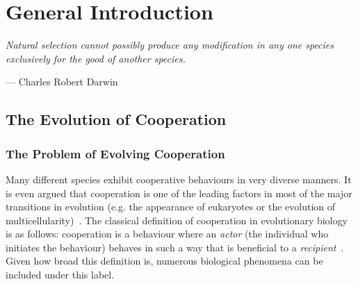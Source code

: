 \chapter{General Introduction}

\epigraph{\textit{Natural selection cannot possibly produce any modification in any one species exclusively for the good of another species.}}{--- \textup{Charles Robert Darwin}}

\minitoc[n] %


\section{The Evolution of Cooperation}

  \subsection{The Problem of Evolving Cooperation}

    Many different species exhibit cooperative behaviours in very diverse manners. It is even argued that cooperation is one of the leading factors in most of the major transitions in evolution (e.g. the appearance of eukaryotes or the evolution of multicellularity)~\parencite{Szathmary1995}. The classical definition of cooperation in evolutionary biology is as follows: cooperation is a behaviour where an \emph{actor} (the individual who initiates the behaviour) behaves in such a way that is beneficial to a \emph{recipient}~\parencite{West2007a}. Given how broad this definition is, numerous biological phenomena can be included under this label. 

